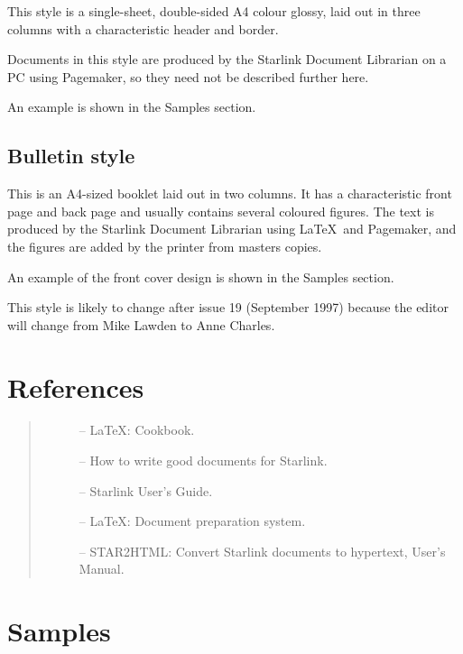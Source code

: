 This style is a single-sheet, double-sided A4 colour glossy, laid out in three
columns with a characteristic header and border.

Documents in this style are produced by the Starlink Document Librarian on a
PC using Pagemaker, so they need not be described further here.

An example is shown in the Samples section.

\subsection{\label{bulletin_style}Bulletin style}

This is an A4-sized booklet laid out in two columns.
It has a characteristic front page and back page and usually contains several
coloured figures.
The text is produced by the Starlink Document Librarian using \LaTeX\ and
Pagemaker, and the figures are added by the printer from masters copies.

An example of the front cover design is shown in the Samples section.

This style is likely to change after issue 19 (September 1997) because the
editor will change from Mike Lawden to Anne Charles.

\section{\label{references}References}

\begin{quote}
\begin{description}
\item [] -- \LaTeX: Cookbook.
\item [] -- How to write good documents for Starlink.
\item [] -- Starlink User's Guide.
\item [] -- \LaTeX: Document preparation system.
\item [] -- 
 STAR2HTML: Convert Starlink documents to hypertext,
User's Manual.
\end{description}
\end{quote}


\appendix

\section{\label{samples}Samples}

